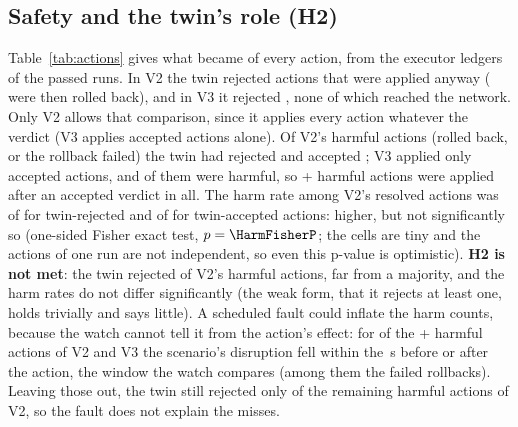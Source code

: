 \documentclass[conference]{IEEEtran}
\begin{document}
\subsection{Safety and the twin's role (H2)}
Table~\ref{tab:actions} gives what became of every action, from the executor ledgers of the passed runs. In V2 the twin rejected \SafeVtwoAppliedTwinRejected{} actions that were applied anyway (\SafeVtwoHarmfulTwinRejected{} were then rolled back), and in V3 it rejected \LedVthreeRejected{}, none of which reached the network. Only V2 allows that comparison, since it applies every action whatever the verdict (V3 applies accepted actions alone). Of V2's \HarmAll{} harmful actions (rolled back, or the rollback failed) the twin had rejected \HarmRejected{} and accepted \HarmAccepted{}; V3 applied only accepted actions, and \HarmVthree{} of them were harmful, so \the\numexpr\HarmAccepted+\HarmVthree\relax{} harmful actions were applied after an accepted verdict in all. The harm rate among V2's resolved actions was \VtwoRejHarm{} of \VtwoRejTotal{} for twin-rejected and \VtwoAccHarm{} of \VtwoAccTotal{} for twin-accepted actions: higher, but not significantly so (one-sided Fisher exact test, $p=\HarmFisherP$; the cells are tiny and the actions of one run are not independent, so even this p-value is optimistic). \textbf{H2 is not met}: the twin rejected \HarmRejected{} of V2's \HarmAll{} harmful actions, far from a majority, and the harm rates do not differ significantly (the weak form, that it rejects at least one, holds trivially and says little). A scheduled fault could inflate the harm counts, because the watch cannot tell it from the action's effect: for \HarmStraddle{} of the \the\numexpr\HarmAll+\HarmVthree\relax{} harmful actions of V2 and V3 the scenario's disruption fell within the \CfgWatch\,s before or after the action, the window the watch compares (among them the \RbFailApFail{} failed rollbacks). Leaving those out, the twin still rejected only \HarmClearRejected{} of the \HarmClearVtwo{} remaining harmful actions of V2, so the fault does not explain the misses.
\end{document}
